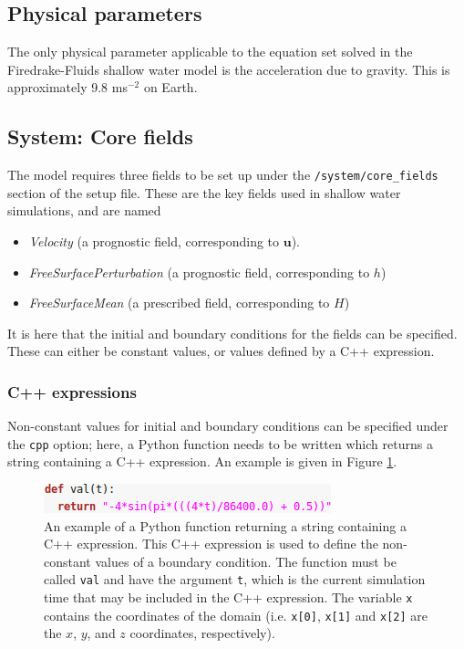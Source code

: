 \documentclass[a4paper,11pt]{report}
\begin{document}
\subsection{Physical parameters}
The only physical parameter applicable to the equation set solved in the Firedrake-Fluids shallow water model is the acceleration due to gravity. This is approximately 9.8 ms$^{-2}$ on Earth.

\subsection{System: Core fields}
The model requires three fields to be set up under the \texttt{/system/core\_fields} section of the setup file. These are the key fields used in shallow water simulations, and are named
\begin{itemize}
   \item \textit{Velocity} (a prognostic field, corresponding to $\mathbf{u}$).
   \item \textit{FreeSurfacePerturbation} (a prognostic field, corresponding to $h$)
   \item \textit{FreeSurfaceMean} (a prescribed field, corresponding to $H$)
\end{itemize}
It is here that the initial and boundary conditions for the fields can be specified. These can either be constant values, or values defined by a C++ expression.

\subsubsection{C++ expressions}
Non-constant values for initial and boundary conditions can be specified under the \texttt{cpp} option; here, a Python function needs to be written which returns a string containing a C++ expression. An example is given in Figure \ref{fig:cpp_expression}.

\begin{figure}[!ht]
   \centering
   \includegraphics[width=0.5\columnwidth]{images/cpp_expression.png}
   \caption{An example of a Python function returning a string containing a C++ expression. This C++ expression is used to define the non-constant values of a boundary condition. The function must be called \texttt{val} and have the argument \texttt{t}, which is the current simulation time that may be included in the C++ expression. The variable \texttt{x} contains the coordinates of the domain (i.e. \texttt{x[0]}, \texttt{x[1]} and \texttt{x[2]} are the $x$, $y$, and $z$ coordinates, respectively).}
   \label{fig:cpp_expression}
\end{figure}
\end{document}
